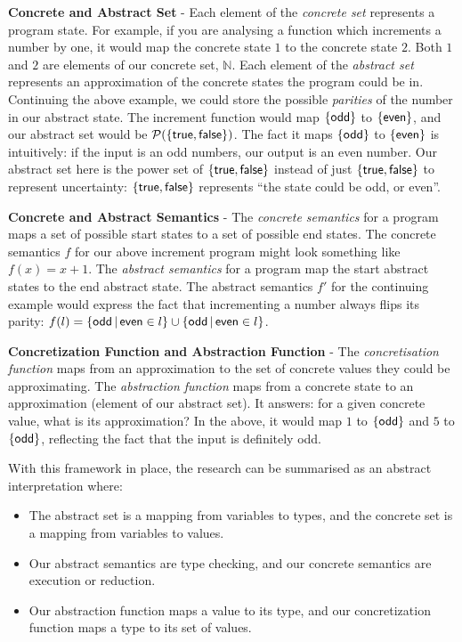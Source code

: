 \documentclass[12pt,twoside]{report}
\begin{document}
\textbf{Concrete and Abstract Set} - Each element of the \textit{concrete set} represents a program state. For example, if you are analysing a function which increments a number by one, it would map the concrete state $1$ to the concrete state $2$. Both $1$ and $2$ are  elements of our concrete set, $\mathbb{N}$. Each element of the \textit{abstract set} represents an approximation of the concrete states the program could be in. Continuing the above example, we could store the possible \textit{parities} of the number in our abstract state. The increment function would map $\{ \mathsf{odd} \}$ to $\{ \mathsf{even} \}$, and our abstract set would be $\mathcal{P}({\{ \mathsf{true}, \mathsf{false} \}})$. The fact it maps $\{ \mathsf{odd} \}$ to $\{ \mathsf{even} \}$ is intuitively: if the input is an odd numbers, our output is an even number. Our abstract set here is the power set of ${\{ \mathsf{true}, \mathsf{false} \}}$ instead of just ${\{ \mathsf{true}, \mathsf{false} \}}$ to represent uncertainty: $\{ \mathsf{true}, \mathsf{false} \}$ represents ``the state could be odd, or even''.

\textbf{Concrete and Abstract Semantics} - The \textit{concrete semantics} for a program maps a set of possible start states to a set of possible end states. The concrete semantics $f$ for our above increment program might look something like $f (x) = x + 1$. The \textit{abstract semantics} for a program map the start abstract states to the end abstract state. The abstract semantics $f'$ for the continuing example would express the fact that incrementing a number always flips its parity: $f (l) = \{ \mathsf{odd} \,|\, \mathsf{even} \in l \} \cup \{ \mathsf{odd} \,|\, \mathsf{even} \in l \}$.

\textbf{Concretization Function and Abstraction Function} - The \textit{concretisation function} maps from an approximation to the set of concrete values they could be approximating. The \textit{abstraction function} maps from a concrete state to an approximation (element of our abstract set). It answers: for a given concrete value, what is its approximation? In the above, it would map $1$ to $\{ \mathsf{odd} \}$ and $5$ to $\{ \mathsf{odd} \}$, reflecting the fact that the input is definitely odd.

With this framework in place, the research can be summarised as an abstract interpretation where:

\begin{itemize}
  \item The abstract set is a mapping from variables to types, and the concrete set is a mapping from variables to values.
  \item Our abstract semantics are type checking, and our concrete semantics are execution or reduction.
  \item Our abstraction function maps a value to its type, and our concretization function maps a type to its set of values.
\end{itemize}
\end{document}
